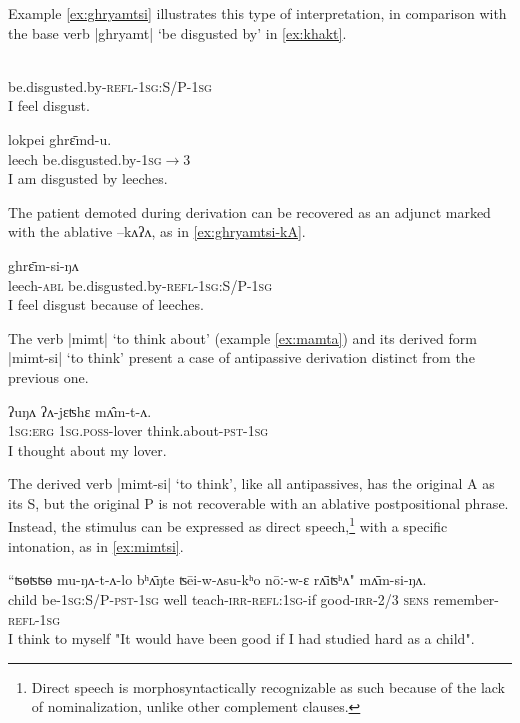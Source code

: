\documentclass[twoside,a4paper,11pt]{article}
\newcommand{\ipa}[1]{{\phon#1}}
\begin{document}
Example \ref{ex:ghryamtsi} illustrates this type of interpretation, in comparison with the base verb |\ipa{ghryamt}| `be disgusted by' in \ref{ex:khakt}.

 \begin{exe}
\ex \label{ex:ghryamtsi} 
\gll \ipa{ghrɛ̄m-si-ŋʌ}\\
 be.disgusted.by-\textsc{refl-1sg:S/P-1sg} \\
\glt  I feel disgust.
\end{exe}

\begin{exe}
\ex \label{ex:ghryamt} 
\gll 
  	\ipa{lokpei}  	\ipa{ghrɛ̄md-u.}  \\
leech  be.disgusted.by-\textsc{1sg$\rightarrow$3} \\
 \glt  I am disgusted by leeches.
\end{exe}

The patient demoted during derivation can be recovered as an adjunct marked with the ablative \ipa{--kʌʔʌ}, as in \ref{ex:ghryamtsi-kA}.

 \begin{exe}
\ex \label{ex:ghryamtsi-kA} 
\gll 	\ipa{lokpei-kʌʔʌ} \ipa{ghrɛ̄m-si-ŋʌ}\\
leech-\textsc{abl} be.disgusted.by-\textsc{refl-1sg:S/P-1sg} \\
 \glt  I feel disgust because of leeches.
\end{exe}
 

The verb |\ipa{mimt}| `to think about' (example \ref{ex:mamta}) and its derived form |\ipa{mimt-si}| `to think' present a case of antipassive derivation distinct from the previous one. 

\begin{exe}
\ex \label{ex:mamta}
\gll
\ipa{ʔuŋʌ} 	\ipa{ʔʌ-jɛʦhɛ} 	\ipa{mʌ̂m-t-ʌ.} \\
\textsc{1sg:erg} \textsc{1sg.poss}-lover think.about-\textsc{pst-1sg} \\
\glt I thought about my lover.
\end{exe}

The derived verb |\ipa{mimt-si}| `to think', like all antipassives, has the original A as its S, but the original P is not recoverable with an ablative postpositional phrase. Instead, the stimulus can be expressed as direct speech,\footnote{Direct speech is morphosyntactically recognizable as such because of the lack of nominalization, unlike other complement clauses.} with a specific intonation, as in \ref{ex:mimtsi}.

\begin{exe}
\ex \label{ex:mimtsi}
\gll ``\ipa{ʦɵʦʦɵ}  	\ipa{mu-ŋʌ-t-ʌ-lo}  	\ipa{bʰʌ̄ŋte}  	\ipa{ʦēi-w-ʌsu-kʰo}  	\ipa{nōː-w-ɛ}  	\ipa{rʌ̄iʦʰʌ}"  	\ipa{mʌ̄m-si-ŋʌ.}  \\
child be-\textsc{1sg:S/P-pst-1sg} well teach-\textsc{irr-refl:1sg}-if good-\textsc{irr-2/3} \textsc{sens} remember-\textsc{refl-1sg} \\
\glt  I think to myself "It would have been good if I had studied hard as a child".
\end{exe}
\end{document}
